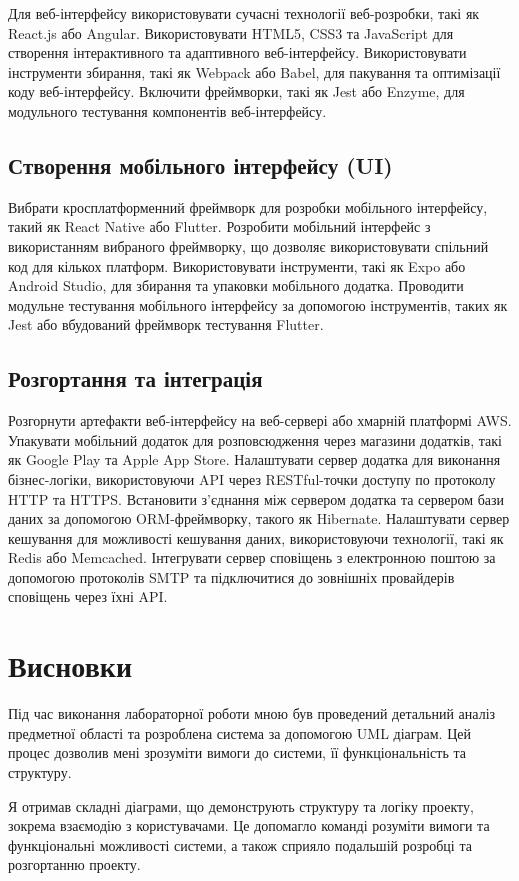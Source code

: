 \documentclass[oneside,14pt]{extarticle}
\begin{document}
\begin{normalsize}
    Для веб-інтерфейсу використовувати сучасні технології веб-розробки, такі як React.js або Angular.
Використовувати HTML5, CSS3 та JavaScript для створення інтерактивного та адаптивного веб-інтерфейсу.
Використовувати інструменти збирання, такі як Webpack або Babel, для пакування та оптимізації коду веб-інтерфейсу.
Включити фреймворки, такі як Jest або Enzyme, для модульного тестування компонентів веб-інтерфейсу.
	
\subsection*{Створення мобільного інтерфейсу (UI)}
	
    Вибрати кросплатформенний фреймворк для розробки мобільного інтерфейсу, такий як React Native або Flutter.
Розробити мобільний інтерфейс з використанням вибраного фреймворку, що дозволяє використовувати спільний код для кількох платформ.
Використовувати інструменти, такі як Expo або Android Studio, для збирання та упаковки мобільного додатка.
Проводити модульне тестування мобільного інтерфейсу за допомогою інструментів, таких як Jest або вбудований фреймворк тестування Flutter.
	
\subsection*{Розгортання та інтеграція}
	
    Розгорнути артефакти веб-інтерфейсу на веб-сервері або хмарній платформі AWS.
Упакувати мобільний додаток для розповсюдження через магазини додатків, такі як Google Play та Apple App Store.
Налаштувати сервер додатка для виконання бізнес-логіки, використовуючи API через RESTful-точки доступу по протоколу HTTP та HTTPS.
Встановити з'єднання між сервером додатка та сервером бази даних за допомогою ORM-фреймворку, такого як Hibernate.
Налаштувати сервер кешування для можливості кешування даних, використовуючи технології, такі як Redis або Memcached.
Інтегрувати сервер сповіщень з електронною поштою за допомогою протоколів SMTP та підключитися до зовнішніх провайдерів сповіщень через їхні API.


	\section*{Висновки}
	   Під час виконання лабораторної роботи мною був проведений детальний аналіз предметної області та розроблена система за допомогою UML діаграм. Цей процес дозволив мені зрозуміти вимоги до системи, її функціональність та структуру. 
	   
	   Я отримав складні діаграми, що демонструють структуру та логіку проекту, зокрема взаємодію з користувачами. Це допомагло команді розуміти вимоги та функціональні можливості системи, а також сприяло подальшій розробці та розгортанню проекту.
\end{normalsize}
\end{document}
